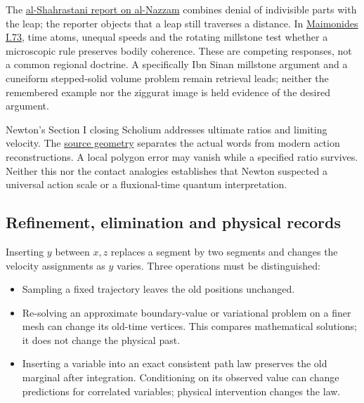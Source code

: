\documentclass[11pt,a4paper]{article}
\newcommand{\tightlist}{\setlength{\itemsep}{0pt}\setlength{\parskip}{0pt}}
\begin{document}
The
\href{../docs/classics/Shahrastani_Nazzam_Leap_Haarbruecker1850_OCR.md}{al-Shahrastani
report on al-Nazzam} combines denial of indivisible parts with the leap;
the reporter objects that a leap still traverses a distance. In
\href{../docs/classics/Maimonides_Guide_PartI_Friedlander_wikisource.md}{Maimonides
I.73}, time atoms, unequal speeds and the rotating millstone test
whether a microscopic rule preserves bodily coherence. These are
competing responses, not a common regional doctrine. A specifically Ibn
Sinan millstone argument and a cuneiform stepped-solid volume problem
remain retrieval leads; neither the remembered example nor the ziggurat
image is held evidence of the desired argument.

Newton's Section I closing Scholium addresses ultimate ratios and
limiting velocity. The
\href{newton-insertion-action.md\#the-source-geometry-and-three-different-areas}{source
geometry} separates the actual words from modern action reconstructions.
A local polygon error may vanish while a specified ratio survives.
Neither this nor the contact analogies establishes that Newton suspected
a universal action scale or a fluxional-time quantum interpretation.

\hypertarget{refinement-elimination-and-physical-records}{%
\subsection{Refinement, elimination and physical
records}\label{refinement-elimination-and-physical-records}}

Inserting \(y\) between \(x,z\) replaces a segment by two segments and
changes the velocity assignments as \(y\) varies. Three operations must
be distinguished:

\begin{itemize}
\tightlist
\item
  Sampling a fixed trajectory leaves the old positions unchanged.
\item
  Re-solving an approximate boundary-value or variational problem on a
  finer mesh can change its old-time vertices. This compares
  mathematical solutions; it does not change the physical past.
\item
  Inserting a variable into an exact consistent path law preserves the
  old marginal after integration. Conditioning on its observed value can
  change predictions for correlated variables; physical intervention
  changes the law.
\end{itemize}
\end{document}
